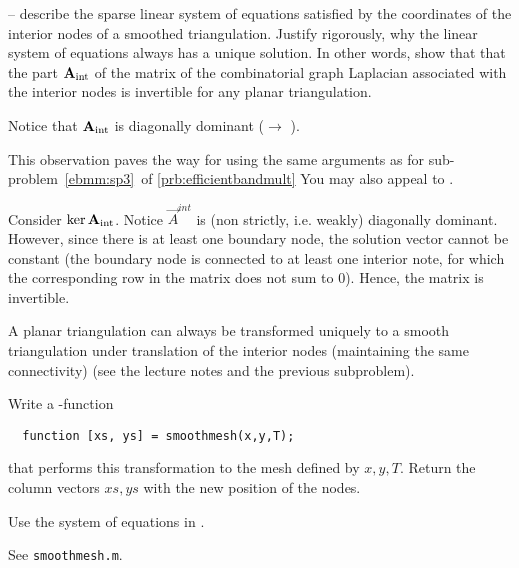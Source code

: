 \begin{problem}
\begin{subproblem}[4]
  -- describe the sparse linear system of equations 
  satisfied by the coordinates of the interior nodes of a smoothed triangulation.
  Justify rigorously, why the linear system of equations  always
  has a unique solution. In other words, show that that the part
  ${\mathbf{A}}_{\mathrm{int}}$ of the matrix of the combinatorial graph Laplacian
  associated with the interior nodes is invertible for any planar triangulation.
  
  \begin{hint}
    Notice that ${\mathbf{A}}_{\mathrm{int}}$ is diagonally dominant ($\to$
    ).
    
    This observation paves the way for using the same arguments as for
    {sub-problem~\ref{ebmm:sp3}}\ of \ref{prb:efficientbandmult}
    You may also appeal to . 
 \end{hint}

 \begin{solution}
  Consider $\ker {\mathbf{A}}_{\mathrm{int}}$. Notice $\vec{A}^{int}$ is (non strictly, i.e. weakly) diagonally dominant. However, since there is at least one boundary node, the solution vector cannot be constant (the boundary node is connected to at least one interior note, for which the corresponding row in the matrix does not sum to $0$). Hence, the matrix is invertible. 
 \end{solution}

\end{subproblem}

\begin{subproblem}[3]
A planar triangulation can always be transformed uniquely to a smooth triangulation under translation of the interior nodes (maintaining the same connectivity) (see the lecture notes and the previous subproblem).

Write a \matlab{}-function
 \begin{verbatim}
  function [xs, ys] = smoothmesh(x,y,T);
 \end{verbatim}
that performs this transformation to the mesh defined by $x,y,T$. Return the column vectors $xs, ys$ with the new position of the nodes.
 
 \begin{hint}
  Use the system of equations in .
 \end{hint}

 \begin{solution}
  See \texttt{smoothmesh.m}.
 \end{solution}
\end{subproblem}

\end{problem}